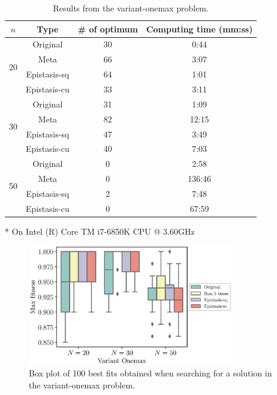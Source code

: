 \begin{table}[ht!]
	\centering
	\begin{threeparttable}
		\caption{Results from the variant-onemax problem.} \label{tab:result_var}
		\begin{tabular}{cccc}
			\toprule
			$ n $ & Type & \# of optimum & Computing time (mm:ss)\tnote{*} \\
			\midrule
			\multirow{4}{*}{20} & Original		& 30 & 0:44 \\
			& Meta			& 66 & 3:07 \\
			& Epistasis-sq	& 64 & 1:01 \\
			& Epistasis-cu	& 33 & 3:11 \\
			\midrule
			\multirow{4}{*}{30} & Original		& 31 & 1:09  \\
			& Meta			& 82 & 12:15 \\
			& Epistasis-sq	& 47 & 3:49  \\
			& Epistasis-cu	& 40 & 7:03  \\
			\midrule
			\multirow{4}{*}{50} & Original		& 0  & 2:58   \\
			& Meta			& 0  & 136:46 \\
			& Epistasis-sq	& 2	 & 7:48   \\
			& Epistasis-cu	& 0	 & 67:59  \\	
			\bottomrule
		\end{tabular}
		\begin{tablenotes}
			\footnotesize
			\item[*] On Intel (R) Core TM i7-6850K CPU @ 3.60GHz
		\end{tablenotes}
	\end{threeparttable}
\end{table}


\begin{figure}[ht!]
	\centering
	\includegraphics[width=0.8\textwidth]{./boxplot_Onemax}
	\caption{Box plot of 100 best fits obtained when searching for a solution in the variant-onemax problem.} \label{fig:boxplot_var}
\end{figure}

